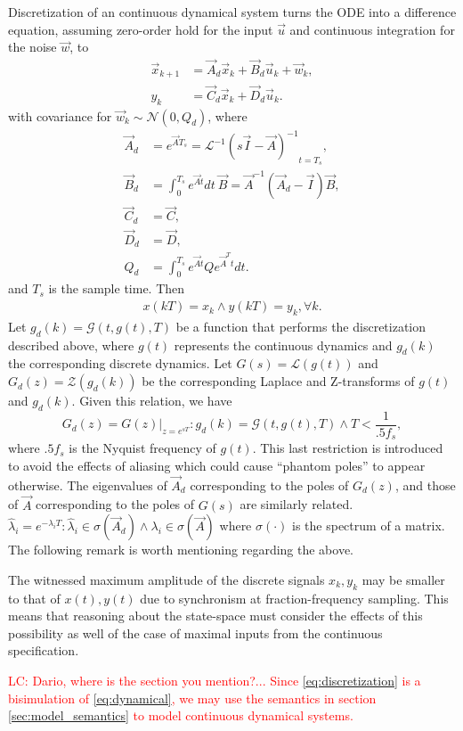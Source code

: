 \documentclass[runningheads,a4paper]{llncs}
\begin{document}
Discretization of an continuous dynamical system turns the ODE into a difference equation, assuming zero-order hold
for the input $\vec{u}$ and continuous integration for the noise $\vec{w}$, to
\begin{align}
\label{eq:discretization}
\vec{x}_{k+1} &= \vec{A}_d\vec{x}_k+\vec{B}_d\vec{u}_k + \vec{w}_k,\\
y_k &= \vec{C}_d \vec{x}_ k + \vec{D}_d \vec{u}_ k. 
\end{align}
with covariance for $\vec{w}_k \sim \mathcal{N}(0,Q_d)$,
where
\begin{align}
\label{eq:discretize}
\vec{A}_d &= e^{\vec{A} T_s} = \mathcal{L}^{-1} { ( s \vec{I} - \vec{A} )^{-1} }_{t = T_s},\\
\vec{B}_d &= \int_{0}^{T_s} e^{\vec{A} t} dt\ \vec{B} = \vec{A}^{-1} ( \vec{A}_d - \vec{I} ) \vec{B},\\
\vec{C}_d &= \vec{C},\\
\vec{D}_d &= \vec{D},\\
Q_d &= \int_{0}^{T_s} e^{\vec{A} t} Q e^{\vec{A}^T t} dt.
\end{align}
and $T_s$ is the sample time. Then
\begin{align*}
x(kT)=x_k \wedge y(kT) = y_k, \forall k.
\end{align*}
Let $g_d(k)=\mathcal{G}(t,g(t),T)$ be a function that performs the discretization described above, where $g(t)$
represents the continuous dynamics and $g_d(k)$ the corresponding discrete dynamics. 
Let $G(s)=\mathcal{L}(g(t))$ and $G_d(z)=\mathcal{Z}(g_d(k))$ be the corresponding Laplace and Z-transforms
of $g(t)$ and $g_d(k)$. Given this relation, we have 
$$G_d(z)=G(z)|_{z=e^{sT}} : g_d(k)=\mathcal{G}(t,g(t),T) \wedge T < \frac{1}{.5f_s},$$
where $.5f_s$ is the Nyquist frequency of $g(t)$. This last restriction is introduced to avoid the effects of aliasing
which could cause ``phantom poles'' to appear otherwise. 
The eigenvalues of $\vec{A}_d$ corresponding to the poles of $G_d(z)$, and those of $\vec{A}$ corresponding to the poles of $G(s)$ are similarly related.
$\hat{\lambda}_i=e^{-\lambda_iT} : \hat{\lambda}_i \in \sigma(\vec{A}_d) \wedge \lambda_i \in \sigma(\vec{A})$
where $\sigma(\cdot)$ is the spectrum of a matrix.
The following remark is worth mentioning regarding the above.
\begin{remark}
The witnessed maximum amplitude of the discrete signals $x_k,y_k$ may be smaller to that of $x(t),y(t)$ due to synchronism at fraction-frequency sampling.
This means that reasoning about the state-space must consider the effects of this possibility as well of the case of maximal inputs from the continuous specification.
\end{remark}
\textcolor{red}{LC: Dario, where is the section you mention?... Since \eqref{eq:discretization} is a bisimulation of \eqref{eq:dynamical}, we may use the semantics in section \ref{sec:model_semantics} to model continuous dynamical systems.}
\end{document}
